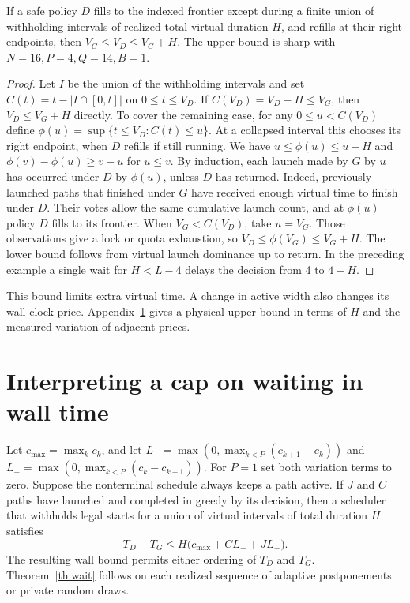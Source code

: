 \begin{theorem}\label{th:wait}
If a safe policy \(D\) fills to the indexed frontier except during a finite union of withholding intervals of realized total virtual duration \(H\), and refills at their right endpoints, then \(V_G\le V_D\le V_G+H\). The upper bound is sharp with \(N=16,P=4,Q=14,B=1\).
\end{theorem}
\begin{proof}
Let \(I\) be the union of the withholding intervals and set \(C(t)=t-|I\cap[0,t]|\) on \(0\le t\le V_D\). If \(C(V_D)=V_D-H\le V_G\), then \(V_D\le V_G+H\) directly. To cover the remaining case, for any \(0\le u<C(V_D)\) define \(\phi(u)=\sup\{t\le V_D:C(t)\le u\}\). At a collapsed interval this chooses its right endpoint, when \(D\) refills if still running. We have \(u\le\phi(u)\le u+H\) and \(\phi(v)-\phi(u)\ge v-u\) for \(u\le v\). By induction, each launch made by \(G\) by \(u\) has occurred under \(D\) by \(\phi(u)\), unless \(D\) has returned. Indeed, previously launched paths that finished under \(G\) have received enough virtual time to finish under \(D\). Their votes allow the same cumulative launch count, and at \(\phi(u)\) policy \(D\) fills to its frontier. When \(V_G<C(V_D)\), take \(u=V_G\). Those observations give a lock or quota exhaustion, so \(V_D\le\phi(V_G)\le V_G+H\). The lower bound follows from virtual launch dominance up to return. In the preceding example a single wait for \(H<L-4\) delays the decision from 4 to \(4+H\).
\end{proof}
This bound limits extra virtual time. A change in active width also changes its wall-clock price. Appendix~\ref{app:clock} gives a physical upper bound in terms of \(H\) and the measured variation of adjacent prices.

\section{Interpreting a cap on waiting in wall time}\label{app:clock}
Let \(c_{\max}=\max_k c_k\), and let \(L_+=\max(0,\max_{k<P}(c_{k+1}-c_k))\) and \(L_-=\max(0,\max_{k<P}(c_k-c_{k+1}))\). For \(P=1\) set both variation terms to zero. Suppose the nonterminal schedule always keeps a path active. If \(J\) and \(C\) paths have launched and completed in greedy by its decision, then a scheduler that withholds legal starts for a union of virtual intervals of total duration \(H\) satisfies
\[
          T_D-T_G \le H\big(c_{\max}+ C L_+ + J L_-\big).
\]
The resulting wall bound permits either ordering of \(T_D\) and \(T_G\). Theorem~\ref{th:wait} follows on each realized sequence of adaptive postponements or private random draws.

